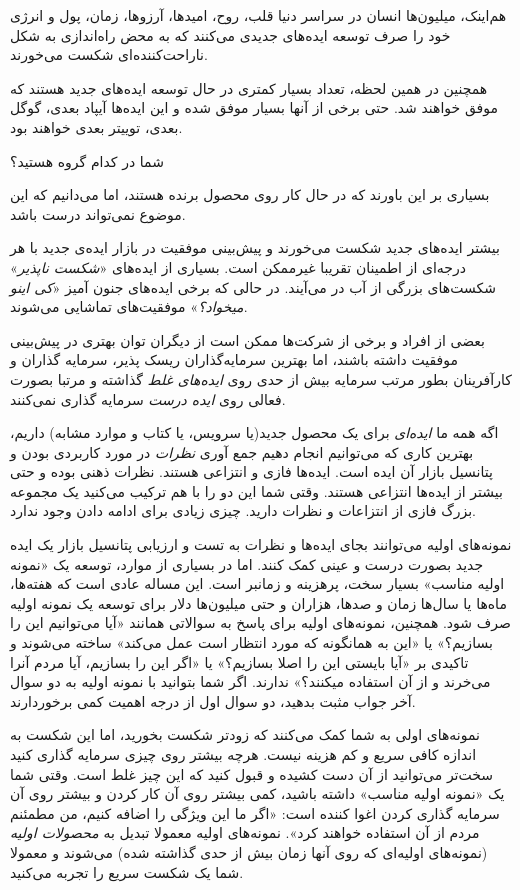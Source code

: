 هم‌اینک، میلیون‌ها انسان در سراسر دنیا قلب، روح، امیدها، آرزوها، زمان،
پول و انرژی خود را صرف توسعه ایده‌های جدیدی می‌کنند که به محض راه‌اندازی
به شکل ناراحت‌کننده‌ای شکست می‌خورند.

همچنین در همین لحظه، تعداد بسیار کمتری در حال توسعه ایده‌های جدید هستند
که موفق خواهند شد. حتی برخی از آنها بسیار موفق شده و این ایده‌ها آیپاد
بعدی، گوگل بعدی، توییتر بعدی خواهند بود.

شما در کدام گروه هستید؟

بسیاری بر این باورند که در حال کار روی محصول برنده هستند، اما می‌دانیم
که این موضوع نمی‌تواند درست باشد.

بیشتر ایده‌های جدید شکست می‌خورند و پیش‌بینی موفقیت در بازار ایده‌ی جدید
با هر درجه‌ای از اطمینان تقریبا غیرممکن است. بسیاری از ایده‌های
«\emph{شکست ناپذیر}» شکست‌های بزرگی از آب در می‌آیند. در حالی که برخی
ایده‌های جنون آمیز «\emph{کی اینو میخواد؟}» موفقیت‌های تماشایی می‌شوند.

بعضی از افراد و برخی از شرکت‌ها ممکن است از دیگران توان بهتری در
پیش‌بینی موفقیت داشته باشند، اما بهترین سرمایه‌گذاران ریسک پذیر، سرمایه
گذاران و کارآفرینان بطور مرتب سرمایه بیش از حدی روی \emph{ایده‌های غلط}
گذاشته و مرتبا بصورت فعالی روی \emph{ایده درست} سرمایه گذاری نمی‌کنند.

اگه همه ما \emph{ایده‌ای} برای یک محصول جدید(یا سرویس، یا کتاب و موارد
مشابه) داریم، بهترین کاری که می‌توانیم انجام دهیم جمع آوری \emph{نظرات}
در مورد کاربردی بودن و پتانسیل بازار آن ایده است. ایده‌ها فازی و انتزاعی
هستند. نظرات ذهنی بوده و حتی بیشتر از ایده‌ها انتزاعی هستند. وقتی شما
این دو را با هم ترکیب می‌کنید یک مجموعه بزرگ فازی از انتزاعات و نظرات
دارید. چیزی زیادی برای ادامه دادن وجود ندارد.

نمونه‌های اولیه می‌توانند بجای ایده‌ها و نظرات به تست و ارزیابی پتانسیل
بازار یک ایده جدید بصورت درست و عینی کمک کنند. اما در بسیاری از موارد،
توسعه یک «نمونه اولیه مناسب» بسیار سخت، پرهزینه و زمانبر است. این مساله
عادی است که هفته‌ها، ماه‌ها یا سال‌ها زمان و صدها، هزاران و حتی
میلیون‌ها دلار برای توسعه یک نمونه اولیه صرف شود. همچنین، نمونه‌های
اولیه برای پاسخ به سوالاتی همانند «آیا می‌توانیم این را بسازیم؟» یا «این
به همانگونه که مورد انتظار است عمل می‌کند» ساخته می‌شوند و تاکیدی بر
«آیا بایستی این را اصلا بسازیم؟» یا «اگر این را بسازیم، آیا مردم آنرا
می‌خرند و از آن استفاده میکنند؟» ندارند. اگر شما بتوانید با نمونه اولیه
به دو سوال آخر جواب مثبت بدهید، دو سوال اول از درجه اهمیت کمی
برخوردارند.

نمونه‌های اولی به شما کمک می‌کنند که زودتر شکست بخورید، اما این شکست به
اندازه کافی سریع و کم هزینه نیست. هرچه بیشتر روی چیزی سرمایه گذاری کنید
سخت‌تر می‌توانید از آن دست کشیده و قبول کنید که این چیز غلط است. وقتی
شما یک «نمونه اولیه مناسب» داشته باشید، کمی بیشتر روی آن کار کردن و
بیشتر روی آن سرمایه گذاری کردن اغوا کننده است: «اگر ما این ویژگی را
اضافه کنیم، من مطمئنم مردم از آن استفاده خواهند کرد». نمونه‌های اولیه
معمولا تبدیل به \emph{محصولات اولیه} (نمونه‌های اولیه‌ای که روی آنها
زمان بیش از حدی گذاشته شده) می‌شوند و معمولا شما یک شکست سریع را تجربه
می‌کنید.

